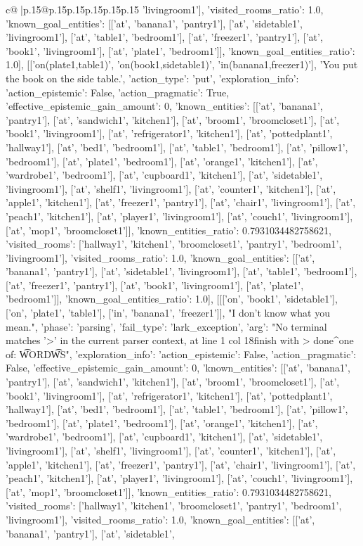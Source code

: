 \documentclass{article}
\begin{document}
{\begin{supertabular}{c@{$\;$}|p{.15\linewidth}@{}p{.15\linewidth}p{.15\linewidth}p{.15\linewidth}p{.15\linewidth}p{.15\linewidth}}
{{{'livingroom1'], 'visited_rooms_ratio': 1.0, 'known_goal_entities': [['at', 'banana1', 'pantry1'], ['at', 'sidetable1', 'livingroom1'], ['at', 'table1', 'bedroom1'], ['at', 'freezer1', 'pantry1'], ['at', 'book1', 'livingroom1'], ['at', 'plate1', 'bedroom1']], 'known_goal_entities_ratio': 1.0}}], [['on(plate1,table1)', 'on(book1,sidetable1)', 'in(banana1,freezer1)'], 'You put the book on the side table.', {'action_type': 'put', 'exploration_info': {'action_epistemic': False, 'action_pragmatic': True, 'effective_epistemic_gain_amount': 0, 'known_entities': [['at', 'banana1', 'pantry1'], ['at', 'sandwich1', 'kitchen1'], ['at', 'broom1', 'broomcloset1'], ['at', 'book1', 'livingroom1'], ['at', 'refrigerator1', 'kitchen1'], ['at', 'pottedplant1', 'hallway1'], ['at', 'bed1', 'bedroom1'], ['at', 'table1', 'bedroom1'], ['at', 'pillow1', 'bedroom1'], ['at', 'plate1', 'bedroom1'], ['at', 'orange1', 'kitchen1'], ['at', 'wardrobe1', 'bedroom1'], ['at', 'cupboard1', 'kitchen1'], ['at', 'sidetable1', 'livingroom1'], ['at', 'shelf1', 'livingroom1'], ['at', 'counter1', 'kitchen1'], ['at', 'apple1', 'kitchen1'], ['at', 'freezer1', 'pantry1'], ['at', 'chair1', 'livingroom1'], ['at', 'peach1', 'kitchen1'], ['at', 'player1', 'livingroom1'], ['at', 'couch1', 'livingroom1'], ['at', 'mop1', 'broomcloset1']], 'known_entities_ratio': 0.7931034482758621, 'visited_rooms': ['hallway1', 'kitchen1', 'broomcloset1', 'pantry1', 'bedroom1', 'livingroom1'], 'visited_rooms_ratio': 1.0, 'known_goal_entities': [['at', 'banana1', 'pantry1'], ['at', 'sidetable1', 'livingroom1'], ['at', 'table1', 'bedroom1'], ['at', 'freezer1', 'pantry1'], ['at', 'book1', 'livingroom1'], ['at', 'plate1', 'bedroom1']], 'known_goal_entities_ratio': 1.0}}], [[['on', 'book1', 'sidetable1'], ['on', 'plate1', 'table1'], ['in', 'banana1', 'freezer1']], "I don't know what you mean.", {'phase': 'parsing', 'fail_type': 'lark_exception', 'arg': "No terminal matches '>' in the current parser context, at line 1 col 18\n\nthen finish with > done\n                 ^\nExpected one of: \n\t* WORD\n\t* WS\n", 'exploration_info': {'action_epistemic': False, 'action_pragmatic': False, 'effective_epistemic_gain_amount': 0, 'known_entities': [['at', 'banana1', 'pantry1'], ['at', 'sandwich1', 'kitchen1'], ['at', 'broom1', 'broomcloset1'], ['at', 'book1', 'livingroom1'], ['at', 'refrigerator1', 'kitchen1'], ['at', 'pottedplant1', 'hallway1'], ['at', 'bed1', 'bedroom1'], ['at', 'table1', 'bedroom1'], ['at', 'pillow1', 'bedroom1'], ['at', 'plate1', 'bedroom1'], ['at', 'orange1', 'kitchen1'], ['at', 'wardrobe1', 'bedroom1'], ['at', 'cupboard1', 'kitchen1'], ['at', 'sidetable1', 'livingroom1'], ['at', 'shelf1', 'livingroom1'], ['at', 'counter1', 'kitchen1'], ['at', 'apple1', 'kitchen1'], ['at', 'freezer1', 'pantry1'], ['at', 'chair1', 'livingroom1'], ['at', 'peach1', 'kitchen1'], ['at', 'player1', 'livingroom1'], ['at', 'couch1', 'livingroom1'], ['at', 'mop1', 'broomcloset1']], 'known_entities_ratio': 0.7931034482758621, 'visited_rooms': ['hallway1', 'kitchen1', 'broomcloset1', 'pantry1', 'bedroom1', 'livingroom1'], 'visited_rooms_ratio': 1.0, 'known_goal_entities': [['at', 'banana1', 'pantry1'], ['at', 'sidetable1', }}}
\end{supertabular}}
\end{document}
